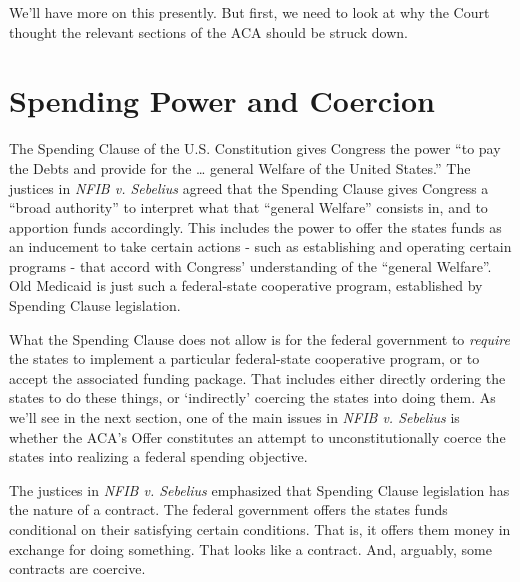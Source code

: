 \documentclass[
  11pt,
  letterpaper,
  DIV=11,
  numbers=noendperiod,
  oneside]{scrartcl}
\begin{document}
We'll have more on this presently. But first, we need to look at why the
Court thought the relevant sections of the ACA should be struck down.

\section{Spending Power and Coercion}\label{spending-power-and-coercion}

The Spending Clause of the U.S. Constitution gives Congress the power
``to pay the Debts and provide for the \ldots{} general Welfare of the
United States.'' The justices in \emph{NFIB v. Sebelius} agreed that the
Spending Clause gives Congress a ``broad authority'' to interpret what
that ``general Welfare'' consists in, and to apportion funds
accordingly. This
includes the power to offer the states funds as an inducement to take
certain actions - such as establishing and operating certain programs -
that accord with Congress' understanding of the ``general Welfare''. Old
Medicaid is just such a federal-state cooperative program, established
by Spending Clause legislation.

What the Spending Clause does not allow is for the federal government to
\emph{require} the states to implement a particular federal-state
cooperative program, or to accept the associated funding package. That
includes either directly ordering the states to do these things, or
`indirectly' coercing the states into doing them. As we'll see in the
next section, one of the main issues in \emph{NFIB v. Sebelius} is
whether the ACA's Offer constitutes an attempt to unconstitutionally
coerce the states into realizing a federal spending
objective.

The justices in \emph{NFIB v. Sebelius} emphasized that Spending Clause
legislation has the nature of a contract. The
federal government offers the states funds conditional on their
satisfying certain conditions. That is, it offers them money in exchange
for doing something. That looks like a contract. And, arguably, some
contracts are coercive.
\end{document}
